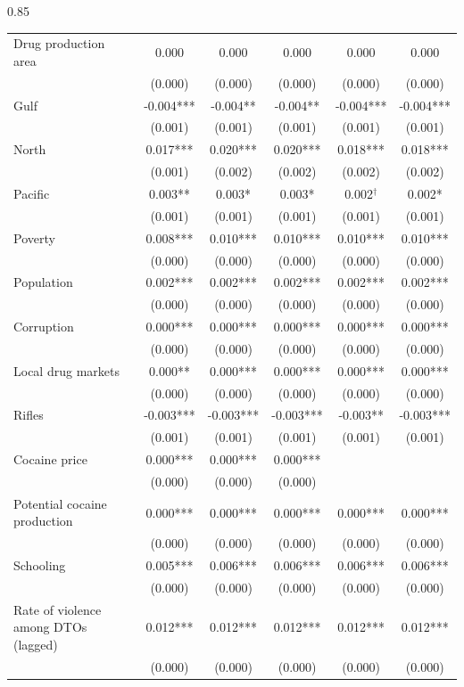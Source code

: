 \documentclass[12pt,letterpaper]{article}
\begin{document}
\begin{landscape}
\begin{center}
\begin{spacing}{0.85}
\begin{longtable}{lccccc}
Drug production area & 0.000  & 0.000  & 0.000  & 0.000  & 0.000  \\
 & (0.000)  & (0.000)  & (0.000)  & (0.000)  & (0.000)  \\
Gulf & -0.004*** & -0.004** & -0.004** & -0.004*** & -0.004*** \\
 & (0.001)  & (0.001)  & (0.001)  & (0.001)  & (0.001)  \\
North & 0.017*** & 0.020*** & 0.020*** & 0.018*** & 0.018*** \\
 & (0.001)  & (0.002)  & (0.002)  & (0.002)  & (0.002)  \\
Pacific & 0.003** & 0.003* & 0.003* & 0.002$^{\dag}$& 0.002* \\
 & (0.001)  & (0.001)  & (0.001)  & (0.001)  & (0.001)  \\
Poverty & 0.008*** & 0.010*** & 0.010*** & 0.010*** & 0.010*** \\
 & (0.000)  & (0.000)  & (0.000)  & (0.000)  & (0.000)  \\
Population & 0.002*** & 0.002*** & 0.002*** & 0.002*** & 0.002*** \\
 & (0.000)  & (0.000)  & (0.000)  & (0.000)  & (0.000)  \\
Corruption & 0.000*** & 0.000*** & 0.000*** & 0.000*** & 0.000*** \\
 & (0.000)  & (0.000)  & (0.000)  & (0.000)  & (0.000)  \\
Local drug markets & 0.000** & 0.000*** & 0.000*** & 0.000*** & 0.000*** \\
 & (0.000)  & (0.000)  & (0.000)  & (0.000)  & (0.000)  \\
Rifles & -0.003*** & -0.003*** & -0.003*** & -0.003** & -0.003*** \\
 & (0.001)  & (0.001)  & (0.001)  & (0.001)  & (0.001)  \\
Cocaine price & 0.000*** & 0.000*** & 0.000*** &   &   \\
 & (0.000)  & (0.000)  & (0.000)  &   &   \\
Potential cocaine production & 0.000*** & 0.000*** & 0.000*** & 0.000*** & 0.000*** \\
 & (0.000)  & (0.000)  & (0.000)  & (0.000)  & (0.000)  \\
Schooling & 0.005*** & 0.006*** & 0.006*** & 0.006*** & 0.006*** \\
 & (0.000)  & (0.000)  & (0.000)  & (0.000)  & (0.000)  \\
Rate of violence among DTOs (lagged) & 0.012*** & 0.012*** & 0.012*** & 0.012*** & 0.012*** \\
 & (0.000)  & (0.000)  & (0.000)  & (0.000)  & (0.000)  \\
                

\end{longtable}
\end{spacing}
\end{center}
\end{landscape}
\end{document}
